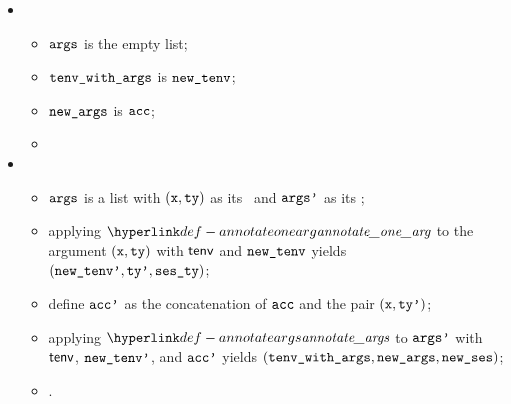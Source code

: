 \ProseParagraph
\OneApplies
\begin{itemize}
  \item {}
  \begin{itemize}
    \item $\texttt{args}$ is the empty list;
    \item $\texttt{tenv\_with\_args}$ is $\texttt{new\_tenv}$;
    \item $\texttt{new\_args}$ is $\texttt{acc}$;
    \item \Proseeqdef{$\vses$}{$\vsesin$}
  \end{itemize}

  \item {}
  \begin{itemize}
    \item $\texttt{args}$ is a list with $(\texttt{x}, \texttt{ty})$ as its \head\ and $\texttt{args'}$ as its \tail;
    \item applying $\annotateonearg$ to the argument $(\texttt{x}, \texttt{ty})$ with $\textsf{tenv}$ and $\texttt{new\_tenv}$ yields
          $(\texttt{new\_tenv'}, \texttt{ty'}, \texttt{ses\_ty})$\ProseOrTypeError;
    \item define $\texttt{acc'}$ as the concatenation of $\texttt{acc}$ and the pair $(\texttt{x}, \texttt{ty'})$;
    \item applying $\annotateargs$ to $\texttt{args'}$ with $\textsf{tenv}$, $\texttt{new\_tenv'}$, and $\texttt{acc'}$ yields $(\texttt{tenv\_with\_args}, \texttt{new\_args}, \texttt{new\_ses})$;
    \item {}.
  \end{itemize}
\end{itemize}

\FormallyParagraph
{}

